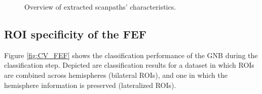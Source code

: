 \documentclass[a4paper, 12pt]{scrreprt}
\begin{document}
\begin{figure}[H]
	\caption{\small{Overview of extracted scanpaths' characteristics.}}
	\label{fig:dist_hist}
\end{figure}

\subsection{ROI specificity of the FEF}

Figure \ref{fig:CV_FEF} shows the classification performance of the GNB during the classification step. Depicted are classification results for a dataset in which ROIs are combined across hemispheres (bilateral ROIs), and one in which the hemisphere information is preserved (lateralized ROIs). 
\end{document}
